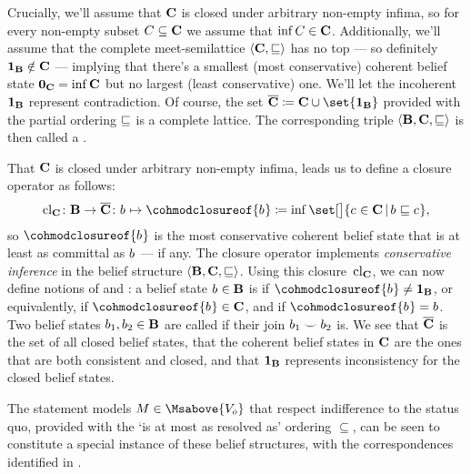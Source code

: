 \documentclass[preprint]{isipta2025}
\begin{document}
Crucially, we'll assume that \(\cohmods\) is closed under arbitrary non-empty infima, so for every non-empty subset \(C\subseteq\cohmods\) we assume that \(\inf C\in\cohmods\).
Additionally, we'll assume that the complete meet-semilattice \(\structure{\cohmods,\modleq}\) has no top --- so definitely \(\belmodtop\notin\cohmods\) --- implying that there's a smallest (most conservative) coherent belief state \(\cohmodbottom=\inf\cohmods\) but no largest (least conservative) one.
We'll let the incoherent \(\belmodtop\) represent contradiction.
Of course, the set \(\closedmods\coloneqq\cohmods\cup\set{\belmodtop}\) provided with the partial ordering \(\modleq\) is a complete lattice.
The corresponding triple \(\structure{\belmods,\cohmods,\modleq}\) is then called a .

That \(\cohmods\) is closed under arbitrary non-empty infima, leads us to define a closure operator as follows:
\begin{equation*}
\cohmodclosure
\colon\belmods\to\closedmods
\colon\belmod\mapsto\cohmodclosureof{\belmod}\coloneqq\inf\set[\big]{\cohmod\in\cohmods\given\belmod\modleq\cohmod},
\end{equation*}
so \(\cohmodclosureof{\belmod}\) is the most conservative coherent belief state that is at least as committal as \(\belmod\) --- if any.
The closure operator implements \emph{conservative inference} in the belief structure \(\structure{\belmods,\cohmods,\modleq}\).
Using this closure~\(\cohmodclosure\), we can now define notions of  and : a belief state \(\belmod\in\belmods\) is  if \( \cohmodclosureof{\belmod}\neq\belmodtop\), or equivalently, if \(\cohmodclosureof{\belmod}\in\cohmods\), and  if \(\cohmodclosureof{\belmod}=\belmod\).
Two belief states \(\belmod[1],\belmod[2]\in\belmods\) are called  if their join \(\belmod[1]\join\belmod[2]\) is.
We see that \(\closedmods\) is the set of all closed belief states, that the coherent belief states in \(\cohmods\) are the ones that are both consistent and closed, and that \(\belmodtop\) represents inconsistency for the closed belief states.

The statement models \(\M\in\Msabove{\zeroM}\) that respect indifference to the status quo, provided with the `is at most as resolved as' ordering \(\subseteq\), can be seen to constitute a special instance of these belief structures, with the correspondences identified in .
\end{document}
